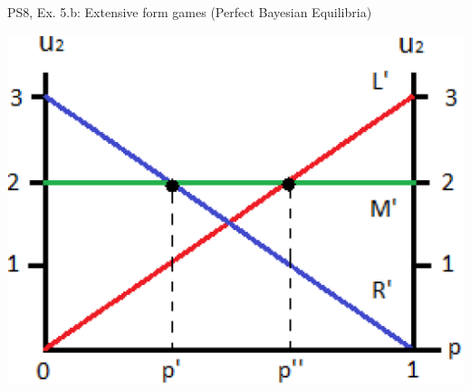 \begin{frame}{PS8, Ex. 5.b: Extensive form games (Perfect Bayesian Equilibria)}
\begin{multicols}{2}
      \includegraphics[width=1.1\columnwidth]{figures/Gibbons_4_1_b_E[u]}
      \vfill\null
    \end{multicols}
\end{frame}

